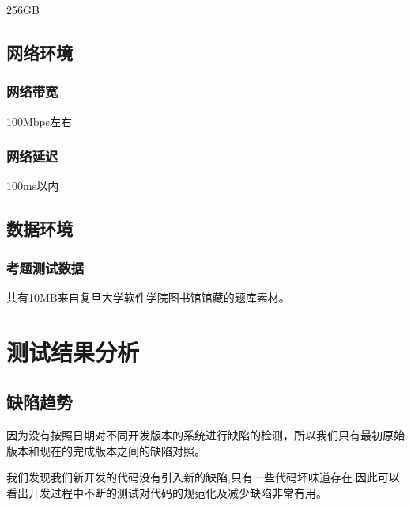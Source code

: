 \documentclass[hyperref, a4paper]{ctexart}
\begin{document}
256GB

\hypertarget{ux7f51ux7edcux73afux5883}{%
\subsection{网络环境}\label{ux7f51ux7edcux73afux5883}}

\hypertarget{ux7f51ux7edcux5e26ux5bbd}{%
\subsubsection{网络带宽}\label{ux7f51ux7edcux5e26ux5bbd}}

100Mbps左右

\hypertarget{ux7f51ux7edcux5ef6ux8fdf}{%
\subsubsection{网络延迟}\label{ux7f51ux7edcux5ef6ux8fdf}}

100ms以内

\hypertarget{ux6570ux636eux73afux5883}{%
\subsection{数据环境}\label{ux6570ux636eux73afux5883}}

\hypertarget{ux8003ux9898ux6d4bux8bd5ux6570ux636e}{%
\subsubsection{考题测试数据}\label{ux8003ux9898ux6d4bux8bd5ux6570ux636e}}

共有10MB来自复旦大学软件学院图书馆馆藏的题库素材。

\hypertarget{ux6d4bux8bd5ux7ed3ux679cux5206ux6790}{%
\section{测试结果分析}\label{ux6d4bux8bd5ux7ed3ux679cux5206ux6790}}

\hypertarget{ux7f3aux9677ux8d8bux52bf}{%
\subsection{缺陷趋势}\label{ux7f3aux9677ux8d8bux52bf}}

因为没有按照日期对不同开发版本的系统进行缺陷的检测，所以我们只有最初原始版本和现在的完成版本之间的缺陷对照。

我们发现我们新开发的代码没有引入新的缺陷,只有一些代码坏味道存在.因此可以看出开发过程中不断的测试对代码的规范化及减少缺陷非常有用。
\end{document}
